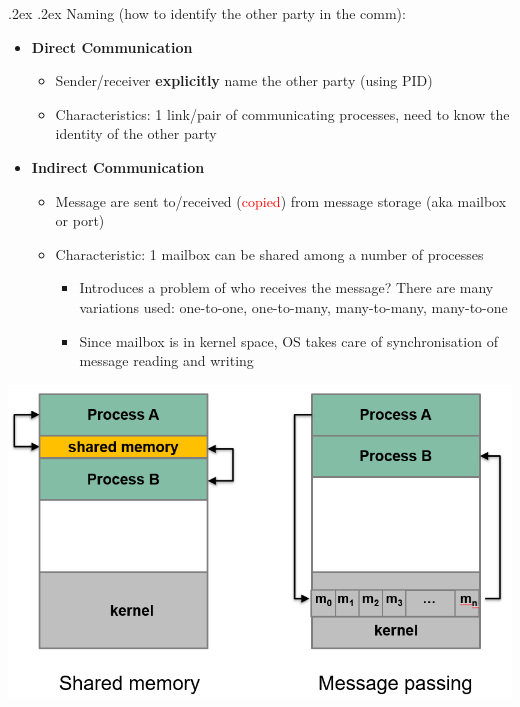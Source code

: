 \documentclass[13pt,landscape,a4paper]{article}
\makeatletter
\renewcommand{\subsubsection}{\@startsection{subsubsection}{1}{0mm}%
    {.2ex}%
    {.2ex}%
    {\rmfamily\bfseries}}
\makeatother
\begin{document}
\begin{multicols*}{3}
        \subsubsection{Naming \textmd{(how to identify the other party in the comm):}}
        \begin{itemize}
            \item \textbf{Direct Communication}
            \begin{itemize}
                \item Sender/receiver \textbf{explicitly} name the other party (using PID)
                \item Characteristics: 1 link/pair of communicating processes, need to know the identity of the other party
            \end{itemize}
            \item \textbf{Indirect Communication}
            \begin{itemize}
                \item Message are sent to/received (\textcolor{red}{copied}) from message storage (aka mailbox or port)
                \item Characteristic: 1 mailbox can be shared among a number of processes
                \begin{itemize}
                    \item Introduces a problem of who receives the message? There are many variations used: one-to-one, one-to-many, many-to-many, many-to-one
                    \item Since mailbox is in kernel space, OS takes care of synchronisation of message reading and writing
                \end{itemize}
            \end{itemize}
        \end{itemize}
        \begin{center}
            \includegraphics[width=0.57\columnwidth]{shared_vs_passing}
        \end{center}

\end{multicols*}
\end{document}
